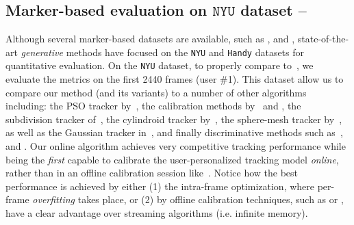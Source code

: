 \subsection{Marker-based evaluation on $\texttt{NYU}$ dataset --
}
\label{sec:evalstar}
Although several marker-based datasets are available, such as \cite{qian2014realtime}, \cite{sharp2015accurate} and \cite{yuan2017bighand}, state-of-the-art \emph{generative} methods have focused on the \texttt{NYU} \cite{tompson2014real} and \texttt{Handy} \cite{tkach2016sphere} datasets for quantitative evaluation. 
 
On the \texttt{NYU} dataset, to properly compare to~\cite{taylor2016joint}, we evaluate the metrics on the first 2440 frames (user \#1). 
This dataset allow us to compare our method (and its variants) to a number of other algorithms including: the PSO tracker by~\cite{sharp2015accurate}, the calibration methods by~\cite{khamis2015learning} and \cite{tan2016fits}, the subdivision tracker of~\cite{taylor2016joint}, the cylindroid tracker by~\cite{htrack}, the sphere-mesh tracker by~\cite{tkach2016sphere}, as well as the Gaussian tracker in~\cite{sridhar2015fast}, and finally discriminative methods such as~\cite{tompson2014real}, \cite{tang2015opening} and \cite{oberweger2015hands}. 
% 
% 
Our online algorithm achieves very competitive tracking performance while being the \emph{first} capable to calibrate the user-personalized tracking model \emph{online}, rather than in an offline calibration session like~\cite{taylor2016joint}. 
% 
Notice how the best performance is achieved by either (1) the intra-frame optimization, where per-frame \emph{overfitting} takes place, or (2) by offline calibration techniques, such as \OfflineSoft{} or \cite{taylor2016joint}, have a clear advantage over streaming algorithms (i.e. infinite memory).  



